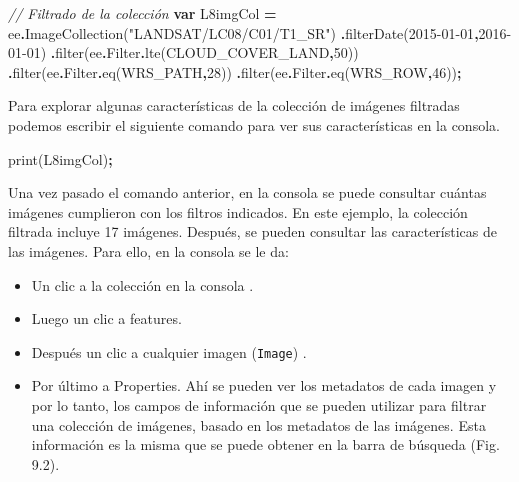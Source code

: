 \documentclass[
  12pt,
  letterpaper,
  twoside]{book}
\newenvironment{Shaded}{\begin{snugshade}}{\end{snugshade}}
\newcommand{\AttributeTok}[1]{\textcolor[rgb]{0.77,0.63,0.00}{#1}}
\newcommand{\CommentTok}[1]{\textcolor[rgb]{0.56,0.35,0.01}{\textit{#1}}}
\newcommand{\DecValTok}[1]{\textcolor[rgb]{0.00,0.00,0.81}{#1}}
\newcommand{\FunctionTok}[1]{\textcolor[rgb]{0.00,0.00,0.00}{#1}}
\newcommand{\KeywordTok}[1]{\textcolor[rgb]{0.13,0.29,0.53}{\textbf{#1}}}
\newcommand{\NormalTok}[1]{#1}
\newcommand{\OperatorTok}[1]{\textcolor[rgb]{0.81,0.36,0.00}{\textbf{#1}}}
\newcommand{\StringTok}[1]{\textcolor[rgb]{0.31,0.60,0.02}{#1}}
\providecommand{\tightlist}{%
  \setlength{\itemsep}{0pt}\setlength{\parskip}{0pt}}
\begin{document}
\begin{Shaded}
\begin{Highlighting}[]
\CommentTok{// Filtrado de la colección}
\KeywordTok{var}\NormalTok{ L8imgCol }\OperatorTok{=}\NormalTok{ ee}\OperatorTok{.}\FunctionTok{ImageCollection}\NormalTok{(}\StringTok{"LANDSAT/LC08/C01/T1\_SR"}\NormalTok{)}
  \OperatorTok{.}\FunctionTok{filterDate}\NormalTok{(}\StringTok{\textquotesingle{}2015{-}01{-}01\textquotesingle{}}\OperatorTok{,}\StringTok{\textquotesingle{}2016{-}01{-}01\textquotesingle{}}\NormalTok{)}
  \OperatorTok{.}\FunctionTok{filter}\NormalTok{(ee}\OperatorTok{.}\AttributeTok{Filter}\OperatorTok{.}\FunctionTok{lte}\NormalTok{(}\StringTok{\textquotesingle{}CLOUD\_COVER\_LAND\textquotesingle{}}\OperatorTok{,}\DecValTok{50}\NormalTok{))}
  \OperatorTok{.}\FunctionTok{filter}\NormalTok{(ee}\OperatorTok{.}\AttributeTok{Filter}\OperatorTok{.}\FunctionTok{eq}\NormalTok{(}\StringTok{\textquotesingle{}WRS\_PATH\textquotesingle{}}\OperatorTok{,}\DecValTok{28}\NormalTok{))}
  \OperatorTok{.}\FunctionTok{filter}\NormalTok{(ee}\OperatorTok{.}\AttributeTok{Filter}\OperatorTok{.}\FunctionTok{eq}\NormalTok{(}\StringTok{\textquotesingle{}WRS\_ROW\textquotesingle{}}\OperatorTok{,}\DecValTok{46}\NormalTok{))}\OperatorTok{;}
\end{Highlighting}
\end{Shaded}

Para explorar algunas características de la colección de imágenes filtradas podemos escribir el siguiente comando para ver sus características en la consola.

\begin{Shaded}
\begin{Highlighting}[]
\FunctionTok{print}\NormalTok{(L8imgCol)}\OperatorTok{;}
\end{Highlighting}
\end{Shaded}

Una vez pasado el comando anterior, en la consola se puede consultar cuántas imágenes cumplieron con los filtros indicados. En este ejemplo, la colección filtrada incluye 17 imágenes. Después, se pueden consultar las características de las imágenes. Para ello, en la consola se le da:

\begin{itemize}
\tightlist
\item
  Un clic a la colección en la consola .
\item
  Luego un clic a features.
\item
  Después un clic a cualquier imagen (\texttt{Image}) .
\item
  Por último a Properties. Ahí se pueden ver los metadatos de cada imagen y por lo tanto, los campos de información que se pueden utilizar para filtrar una colección de imágenes, basado en los metadatos de las imágenes. Esta información es la misma que se puede obtener en la barra de búsqueda (Fig. 9.2).
\end{itemize}
\end{document}
